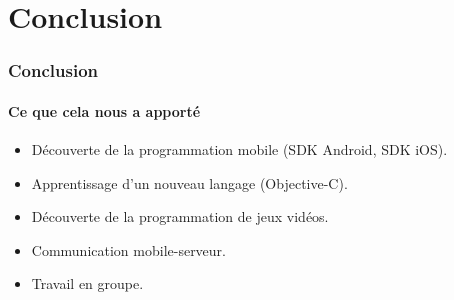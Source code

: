 \section{Conclusion}

\begin{frame}
\frametitle{Conclusion}
\framesubtitle{Ce que cela nous a apporté}
\begin{itemize}
	\item Découverte de la programmation mobile (SDK Android, SDK iOS).
	\item Apprentissage d'un nouveau langage (Objective-C).
	\item Découverte de la programmation de jeux vidéos.
	\item Communication mobile-serveur.
	\item Travail en groupe.
\end{itemize}
\end{frame}
